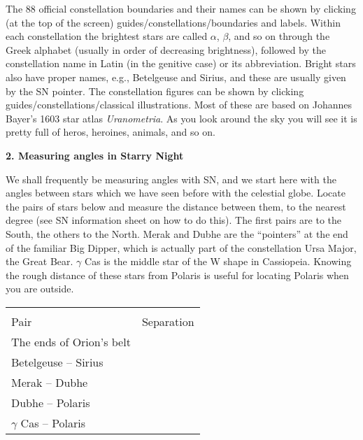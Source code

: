 \documentclass[12pt]{article}
\begin{document}
The 88 official constellation boundaries and their names can be shown
by clicking (at the top of the screen)
guides/constellations/boundaries and labels. Within each constellation
the brightest stars are called $\alpha$, $\beta$, and
so on through the Greek alphabet (usually in order of decreasing
brightness), followed by the constellation name
in Latin (in the genitive case) or its abbreviation. Bright stars also
have proper names, e.g., Betelgeuse and Sirius, and these are usually
given by the SN pointer. The constellation figures can be shown by
clicking guides/constellations/classical illustrations. Most of these
are based on Johannes Bayer's 1603 star atlas \emph{Uranometria}. As
you look around the sky you will see it is pretty full of heros, heroines,
animals, and so on.


\bigskip
\noindent
{\bf 2. Measuring angles in Starry Night}

\medskip
\noindent

\noindent
We shall frequently be measuring angles with SN, and we start here
with the angles between stars which we have seen before with the
celestial globe. Locate the pairs of stars below and measure the
distance between them, to the nearest degree (see SN information sheet
on how to do this). The first pairs are to the South, the others to
the North. Merak and Dubhe are the ``pointers'' at the end of the
familiar Big Dipper, which is actually part of the constellation Ursa
Major, the Great Bear.  $\gamma$ Cas is the middle star of the W shape
in Cassiopeia. Knowing the rough distance of these stars from Polaris
is useful for locating Polaris when you are outside.
 
\begin{center}
\begin{tabular}{lc} \hline \\ [-6pt]
Pair   & \hspace{1cm} Separation \hspace{1cm} \\ [6pt]
\hline
The ends of Orion's belt    &        \\ \hline
Betelgeuse -- Sirius         &       \\ \hline
Merak -- Dubhe            &      \\ \hline
Dubhe -- Polaris          &      \\ \hline
$\gamma$ Cas -- Polaris &  \\ \hline
\end{tabular}
\end{center}
\end{document}

